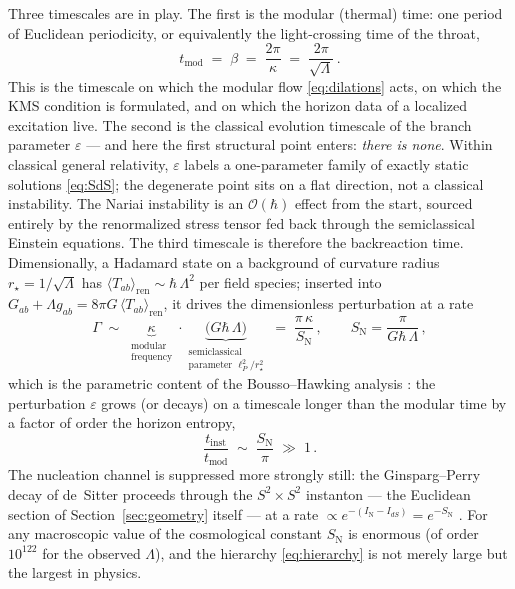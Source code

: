 \documentclass[11pt]{article}
\newcommand{\Nariai}{Nariai}
\begin{document}
Three timescales are in play. The first is the modular (thermal) time: one period of Euclidean periodicity, or equivalently the light-crossing time of the throat,
\begin{equation}
t_{\mathrm{mod}} \;=\; \beta \;=\; \frac{2\pi}{\kappa} \;=\; \frac{2\pi}{\sqrt{\Lambda}}\,.
\label{eq:t-mod}
\end{equation}
This is the timescale on which the modular flow \eqref{eq:dilations} acts, on which the KMS condition is formulated, and on which the horizon data of a localized excitation live. The second is the classical evolution timescale of the branch parameter $\varepsilon$ --- and here the first structural point enters: \emph{there is none}. Within classical general relativity, $\varepsilon$ labels a one-parameter family of exactly static solutions \eqref{eq:SdS}; the degenerate point sits on a flat direction, not a classical instability. The \Nariai{} instability is an $\mathcal{O}(\hbar)$ effect from the start, sourced entirely by the renormalized stress tensor fed back through the semiclassical Einstein equations. The third timescale is therefore the backreaction time. Dimensionally, a Hadamard state on a background of curvature radius $r_\star = 1/\sqrt{\Lambda}$ has $\langle T_{ab}\rangle_{\mathrm{ren}} \sim \hbar\,\Lambda^2$ per field species; inserted into $G_{ab} + \Lambda g_{ab} = 8\pi G\, \langle T_{ab}\rangle_{\mathrm{ren}}$, it drives the dimensionless perturbation at a rate
\begin{equation}
\Gamma \;\sim\; \underbrace{\kappa}_{\substack{\text{modular}\\ \text{frequency}}} \cdot \underbrace{\big(G\hbar\,\Lambda\big)}_{\substack{\text{semiclassical}\\ \text{parameter } \ell_P^2/r_\star^2}}
\;=\; \frac{\pi\,\kappa}{S_{\mathrm{N}}}\,,
\qquad
S_{\mathrm{N}} = \frac{\pi}{G\hbar\,\Lambda}\,,
\label{eq:Gamma}
\end{equation}
which is the parametric content of the Bousso--Hawking analysis \cite{BoussoHawking}: the perturbation $\varepsilon$ grows (or decays) on a timescale longer than the modular time by a factor of order the horizon entropy,
\begin{equation}
\frac{t_{\mathrm{inst}}}{t_{\mathrm{mod}}} \;\sim\; \frac{S_{\mathrm{N}}}{\pi} \;\gg\; 1\,.
\label{eq:hierarchy}
\end{equation}
The nucleation channel is suppressed more strongly still: the Ginsparg--Perry decay of de~Sitter proceeds through the $S^2 \times S^2$ instanton --- the Euclidean section of Section~\ref{sec:geometry} itself --- at a rate $\propto e^{-(I_{\mathrm{N}} - I_{dS})} = e^{-S_{\mathrm{N}}}$ \cite{GinspargPerry}. For any macroscopic value of the cosmological constant $S_{\mathrm{N}}$ is enormous (of order $10^{122}$ for the observed $\Lambda$), and the hierarchy \eqref{eq:hierarchy} is not merely large but the largest in physics.
\end{document}
